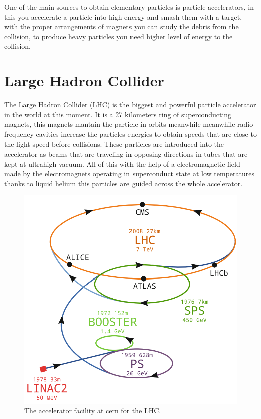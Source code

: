One of the main sources to obtain elementary particles is particle accelerators, in this you accelerate a particle into high energy and smash them with a target, with the proper  arrangements of magnets you can study the debris from the collision, to produce heavy particles you need higher level of energy to the collision.

\section{Large Hadron Collider}

The Large Hadron Collider (LHC) is the biggest and powerful particle accelerator in the world at this moment. It is a 27 kilometers ring of superconducting magnets, this magnets mantain the particle in orbits meanwhile meanwhile radio frequency cavities increase the particles energies to obtain speeds that are close to the light speed before collisions. These particles are introduced into the accelerator as beams that are traveling in opposing directions in tubes that are kept at ultrahigh vacuum. All of this with the help of a electromagnetic field made by the electromagnets operating in superconduct state at low temperatures thanks to liquid helium this particles are guided across the whole accelerator. \cite{LHC}


\begin{figure}[h]
    \centering
   \includegraphics[width=1\textwidth]{LHC.png}
    \caption{The accelerator facility at cern for the LHC. \cite{lhcpic}}
    \label{fig:LHC}
\end{figure}




